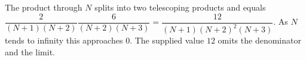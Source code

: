The product through $N$ splits into two telescoping products and equals $\dfrac{2}{(N+1)(N+2)}\dfrac{6}{(N+2)(N+3)}=\dfrac{12}{(N+1)(N+2)^2(N+3)}$. As $N$ tends to infinity this approaches $\boxed 0$. The supplied value $12$ omits the denominator and the limit.
